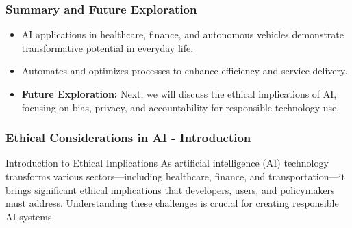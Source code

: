 \documentclass[aspectratio=169]{beamer}
\begin{document}
\begin{frame}[fragile]
    \frametitle{Summary and Future Exploration}
    \begin{itemize}
        \item AI applications in healthcare, finance, and autonomous vehicles demonstrate transformative potential in everyday life.
        \item Automates and optimizes processes to enhance efficiency and service delivery.
        \item \textbf{Future Exploration:} Next, we will discuss the ethical implications of AI, focusing on bias, privacy, and accountability for responsible technology use.
    \end{itemize}
\end{frame}

\begin{frame}[fragile]
    \frametitle{Ethical Considerations in AI - Introduction}
    \begin{block}{Introduction to Ethical Implications}
        As artificial intelligence (AI) technology transforms various sectors—including healthcare, finance, and transportation—it brings significant ethical implications that developers, users, and policymakers must address. Understanding these challenges is crucial for creating responsible AI systems.
    \end{block}
\end{frame}
\end{document}
